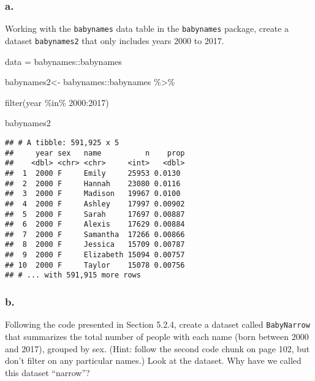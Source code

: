 \documentclass[
]{article}
\newenvironment{Shaded}{\begin{snugshade}}{\end{snugshade}}
\newcommand{\DecValTok}[1]{\textcolor[rgb]{0.00,0.00,0.81}{#1}}
\newcommand{\FunctionTok}[1]{\textcolor[rgb]{0.00,0.00,0.00}{#1}}
\newcommand{\NormalTok}[1]{#1}
\newcommand{\OtherTok}[1]{\textcolor[rgb]{0.56,0.35,0.01}{#1}}
\newcommand{\SpecialCharTok}[1]{\textcolor[rgb]{0.00,0.00,0.00}{#1}}
\begin{document}
\hypertarget{a.-1}{%
\subsubsection{a.}\label{a.-1}}

Working with the \texttt{babynames} data table in the \texttt{babynames}
package, create a dataset \texttt{babynames2} that only includes years
2000 to 2017.

\begin{Shaded}
\begin{Highlighting}[]
\NormalTok{data }\OtherTok{=}\NormalTok{ babynames}\SpecialCharTok{::}\NormalTok{babynames}

\NormalTok{babynames2}\OtherTok{\textless{}{-}}\NormalTok{ babynames}\SpecialCharTok{::}\NormalTok{babynames }\SpecialCharTok{\%\textgreater{}\%}
  
  \FunctionTok{filter}\NormalTok{(year }\SpecialCharTok{\%in\%} \DecValTok{2000}\SpecialCharTok{:}\DecValTok{2017}\NormalTok{)}

\NormalTok{babynames2  }
\end{Highlighting}
\end{Shaded}

\begin{verbatim}
## # A tibble: 591,925 x 5
##     year sex   name          n    prop
##    <dbl> <chr> <chr>     <int>   <dbl>
##  1  2000 F     Emily     25953 0.0130 
##  2  2000 F     Hannah    23080 0.0116 
##  3  2000 F     Madison   19967 0.0100 
##  4  2000 F     Ashley    17997 0.00902
##  5  2000 F     Sarah     17697 0.00887
##  6  2000 F     Alexis    17629 0.00884
##  7  2000 F     Samantha  17266 0.00866
##  8  2000 F     Jessica   15709 0.00787
##  9  2000 F     Elizabeth 15094 0.00757
## 10  2000 F     Taylor    15078 0.00756
## # ... with 591,915 more rows
\end{verbatim}

\hypertarget{b.-1}{%
\subsubsection{b.}\label{b.-1}}

Following the code presented in Section 5.2.4, create a dataset called
\texttt{BabyNarrow} that summarizes the total number of people with each
name (born between 2000 and 2017), grouped by sex. (Hint: follow the
second code chunk on page 102, but don't filter on any particular
names.) Look at the dataset. Why have we called this dataset ``narrow''?
\end{document}
